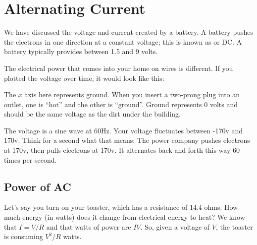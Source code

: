 \chapter{Alternating Current}

We have discussed the voltage and current created by a battery.  A
battery pushes the electrons in one direction at a constant voltage;
this is known as  or DC. A battery typically
provides between 1.5 and 9 volts.

The electrical power that comes into your home on wires is
different. If you plotted the voltage over time, it would look like
this:


The $x$ axis here represents ground. When you insert a two-prong plug
into an outlet, one is ``hot'' and the other is ``ground''. Ground
represents 0 volts and should be the same voltage as the dirt under
the building.

The voltage is a sine wave at 60Hz. Your voltage fluctuates between
-170v and 170v. Think for a second what that means: The power company
pushes electrons at 170v, then pulls electrons at 170v.  It
alternates back and forth this way 60 times per second.

\section{Power of AC}

Let's say you turn on your toaster, which has a resistance of 14.4
ohms. How much energy (in watts) does it change from electrical energy
to heat? We know that $I = V/R$ and that watts of power are
$IV$. So, given a voltage of $V$, the toaster is consuming $V^2/R$
watts.

